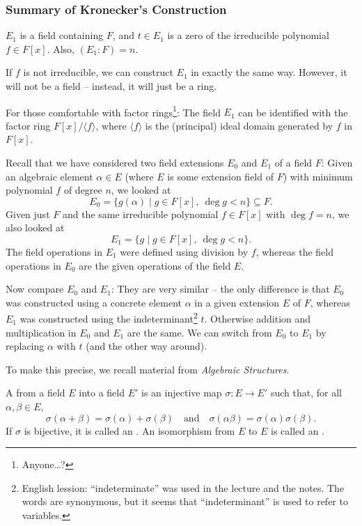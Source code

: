 \subsubsection{Summary of Kronecker's Construction}
$E_1$ is a field containing $F$, and $t \in E_1$ is a zero of the irreducible polynomial $f \in F[x]$. Also, $(E_1 : F) = n$.

\begin{note}
	If $f$ is not irreducible, we can construct $E_1$ in exactly the same way. However, it will not be a field -- instead, it will just be a ring.
	
	For those comfortable with factor rings\footnote{Anyone\dots?}: The field $E_1$ can be identified with the factor ring $F[x] / \langle f \rangle$, where $\langle f \rangle$ is the (principal) ideal domain generated by $f$ in $F[x]$.
\end{note}

Recall that we have considered two field extensions $E_0$ and $E_1$ of a field $F$: Given an algebraic element $\alpha \in E$ (where $E$ is some extension field of $F$) with minimum polynomial $f$ of degree $n$, we looked at
\[
	E_0 = \{g(\alpha) \mid g \in F[x],\ \deg{g} < n\} \subseteq F.
\]
Given just $F$ and the same irreducible polynomial $f \in F[x]$ with $\deg{f} = n$, we also looked at
\[
	E_1 = \{g \mid g \in F[x],\ \deg{g} < n\}.
\]
The field operations in $E_1$ were defined using division by $f$, whereas the field operations in $E_0$ are the given operations of the field $E$.

Now compare $E_0$ and $E_1$: They are very similar -- the only difference is that $E_0$ was constructed using a concrete element $\alpha$ in a given extension $E$ of $F$, whereas $E_1$ was constructed using the indeterminant\footnote{English lession: ``indeterminate'' was used in the lecture and the notes. The words are synonymous, but it seems that ``indeterminant'' is used to refer to variables.} $t$. Otherwise addition and multiplication in $E_0$ and $E_1$ are the same. We can switch from $E_0$ to $E_1$ by replacing $\alpha$ with $t$ (and the other way around).

To make this precise, we recall material from \emph{Algebraic Structures}.

\begin{definition}\label{def:mono-iso-auto-morphism}
	A  from a field $E$ into a field $E'$ is an injective map $\sigma : E \to E'$ such that, for all $\alpha, \beta \in E$,
	\[
		\sigma(\alpha + \beta) = \sigma(\alpha) + \sigma(\beta) \quad \text{and} \quad \sigma(\alpha \beta) = \sigma(\alpha)\sigma(\beta).
	\]
	If $\sigma$ is bijective, it is called an . An isomorphism from $E$ to $E$ is called an .
\end{definition}


